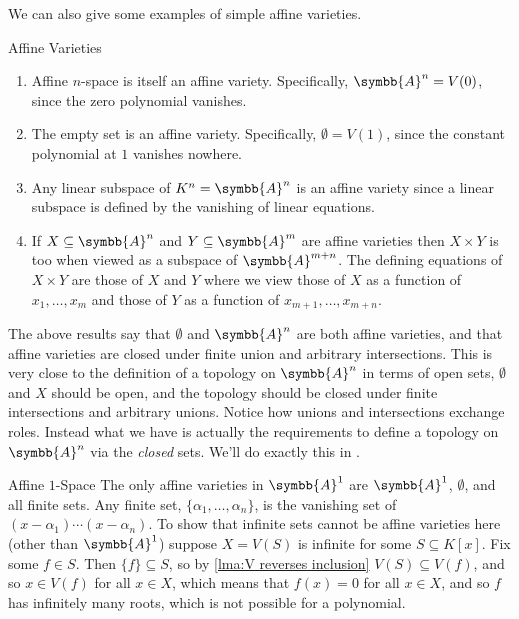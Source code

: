 \documentclass[fleqn]{NotesClass}
\newcommand{\affine}{\symbb{A}}
\begin{document}
    We can also give some examples of simple affine varieties.
    
    \begin{exm}{Affine Varieties}{}
        \begin{enumerate}
            \item Affine \(n\)-space is itself an affine variety.
            Specifically, \(\affine^n = V(0)\), since the zero polynomial vanishes.
            \item The empty set is an affine variety.
            Specifically, \(\emptyset = V(1)\), since the constant polynomial at \(1\) vanishes nowhere.
            \item Any linear subspace of \(K^n = \affine^n\) is an affine variety since a linear subspace is defined by the vanishing of linear equations.
            \item If \(X \subseteq \affine^n\) and \(Y \subseteq \affine^m\) are affine varieties then \(X \times Y\) is too when viewed as a subspace of \(\affine^{m + n}\).
            The defining equations of \(X \times Y\) are those of \(X\) and \(Y\) where we view those of \(X\) as a function of \(x_1, \dotsc, x_m\) and those of \(Y\) as a function of \(x_{m + 1}, \dotsc, x_{m + n}\).
        \end{enumerate}
    \end{exm}
    
    \begin{remark}{}{}
        The above results say that \(\emptyset\) and \(\affine^n\) are both affine varieties, and that affine varieties are closed under finite union and arbitrary intersections.
        This is very close to the definition of a topology on \(\affine^n\) in terms of open sets, \(\emptyset\) and \(X\) should be open, and the topology should be closed under finite intersections and arbitrary unions.
        Notice how unions and intersections exchange roles.
        Instead what we have is actually the requirements to define a topology on \(\affine^n\) via the \emph{closed} sets.
        We'll do exactly this in . %
    \end{remark}
    
    \begin{exm}{Affine \(1\)-Space}{}
        The only affine varieties in \(\affine^1\) are \(\affine^1\), \(\emptyset\), and all finite sets.
        Any finite set, \(\{\alpha_1, \dotsc, \alpha_n\}\), is the vanishing set of \((x - \alpha_1) \dotsm (x - \alpha_n)\).
        To show that infinite sets cannot be affine varieties here (other than \(\affine^1\)) suppose \(X = V(S)\) is infinite for some \(S \subseteq K[x]\).
        Fix some \(f \in S\).
        Then \(\{f\} \subseteq S\), so by \cref{lma:V reverses inclusion} \(V(S) \subseteq V(f)\), and so \(x \in V(f)\) for all \(x \in X\), which means that \(f(x) = 0\) for all \(x \in X\), and so \(f\) has infinitely many roots, which is not possible for a polynomial.
    \end{exm}
    
\end{document}
